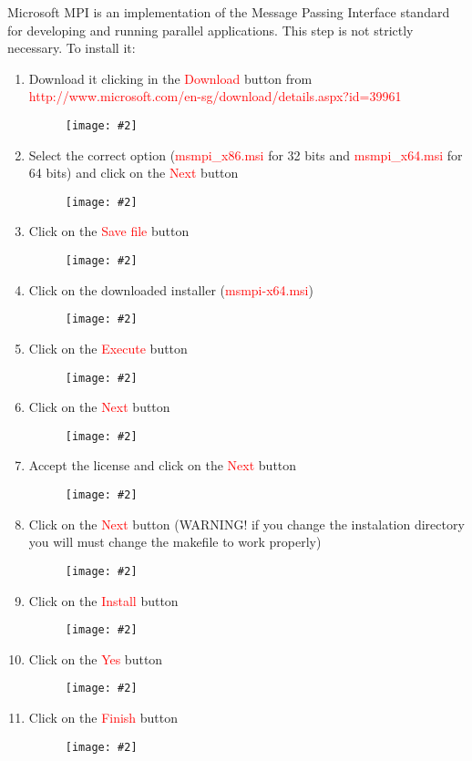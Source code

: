 \documentclass[a4paper]{article}
\newcommand{\FIG}[2]
{
	\begin{figure}[ht!]
	\centering
	\texttt{[image: \#2]}
	\end{figure}
}
\newcommand{\FIGURE}[1]{\FIG{0.35}{#1}}
\newcommand{\RED}[1] {\textcolor{red}{#1}}
\begin{document}
Microsoft MPI is an implementation of the Message Passing Interface standard for
developing and running parallel applications. This step is not strictly
necessary. To install it:

\begin{enumerate}

\item Download it clicking in the \RED{Download} button from\\
\RED{http://www.microsoft.com/en-sg/download/details.aspx?id=39961}
\FIGURE{mpi-1.png}

\clearpage

\item Select the correct option (\RED{msmpi\_x86.msi} for 32 bits and
\RED{msmpi\_x64.msi} for 64 bits) and click on the \RED{Next} button
\FIGURE{mpi-2.png}

\item Click on the \RED{Save file} button
\FIGURE{mpi-3.png}

\clearpage

\item Click on the downloaded installer (\RED{msmpi-x64.msi})
\FIGURE{mpi-4.png}

\item Click on the \RED{Execute} button
\FIGURE{mpi-5.png}

\clearpage

\item Click on the \RED{Next} button
\FIGURE{mpi-6.png}

\item Accept the license and click on the \RED{Next} button
\FIGURE{mpi-7.png}

\clearpage

\item Click on the \RED{Next} button (WARNING! if you change the instalation
directory you will must change the makefile to work properly)
\FIGURE{mpi-8.png}

\item Click on the \RED{Install} button
\FIGURE{mpi-9.png}

\clearpage

\item Click on the \RED{Yes} button
\FIGURE{mpi-10.png}

\item Click on the \RED{Finish} button
\FIGURE{mpi-11.png}

\clearpage

\end{enumerate}
\end{document}
